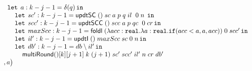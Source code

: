 \begin{figure}
\[\begin{array}{l}
 \hspace{0.4cm} \mathop{\mathtt{let}} \; a: k - j - 1 = \delta (q)  \mathop{ \mathtt{in}} \\
 \hspace{0.8cm} \mathop{\mathtt{let}} \; sc': k - j - 1 =  \mathsf{updtSC} \; () \; sc  \; a \; p
                \; q \; il \;  \; 0 \;  n \;  \mathop{ \mathtt{in}} \\
 \hspace{0.8cm} \mathop{\mathtt{let}} \; scc': k - j - 1 =  \mathsf{updtSCC} \; () \; scc \; a \; p
                \; qc \;  \; 0 \;  cr \mathop{ \mathtt{in}} \\
 \hspace{0.8cm} \mathop{\mathtt{let}} \; maxScc: k - j - 1 =  \mathsf{foldl} \; 
                (\lambda acc : \mathtt{real}. \lambda a: \mathtt{real}. 
                \mathtt{if} ( acc < a, a, acc)) \; 0 \; scc' \mathop{ \mathtt{in}} \\
 \hspace{0.8cm} \mathop{\mathtt{let}} \; il': k - j - 1 =  \mathsf{updtI}  \; () \; maxScc \; sc
                \; 0 \; n  \mathop{ \mathtt{in}} \\
 \hspace{0.8cm} \mathop{\mathtt{let}} \; db': k - j - 1 =  db \setminus il' \mathop{ \mathtt{in}} \\
 \hspace{1.2cm} \mathsf{multiRound} () [k] [j + 1] \;  k 
                \; (j+1)  \; sc' \; scc' \; il'
                \; n \; cr \; db'\\ 
 \hspace{0.2cm} , a  \big )
\end{array}
\]

\end{figure}


